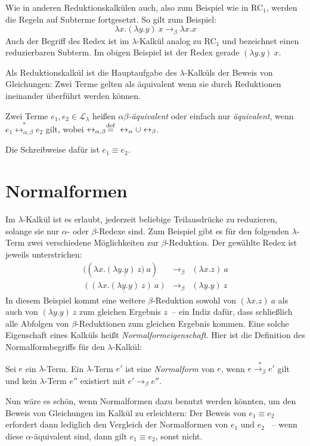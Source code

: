 Wie in anderen Reduktionskalkülen auch, also zum Beispiel wie in
RC$_1$, werden die Regeln auf Subterme fortgesetzt.  So gilt zum
Beispiel:
%
\begin{displaymath}
  \lambda x.(\lambda y.y)~x \rightarrow_{\beta} \lambda x.x
\end{displaymath}
%
Auch der Begriff des Redex ist im $\lambda$-Kalkül analog zu RC$_1$
und bezeichnet einen reduzierbaren Subterm.  Im obigen Beispiel ist
der Redex gerade $(\lambda y.y)~x$.

Als Reduktionskalkül ist die Hauptaufgabe des $\lambda$-Kalküls der
Beweis von Gleichungen: Zwei Terme gelten als äquivalent wenn
sie durch Reduktionen ineinander überführt werden können.
%
\begin{definition}
  Zwei Terme $e_1, e_2\in\mathcal{L}_{\lambda}$ heißen
  \textit{$\alpha\beta$-äquivalent} oder einfach nur
  \textit{äquivalent}, wenn
  \(e_1 \overset{\ast}{\leftrightarrow_{\alpha,\beta}} e_2\)
  gilt, wobei \(\leftrightarrow_{\alpha,\beta} \stackrel{\rm def}{=}{}
  \leftrightarrow_{\alpha} \cup \leftrightarrow_{\beta}\).

  Die Schreibweise dafür ist \(e_1\equiv e_2\).
\end{definition}

\section{Normalformen}
\label{sec:normalformen}

Im $\lambda$-Kalkül ist es erlaubt,
jederzeit beliebige Teilausdrücke zu reduzieren, solange sie nur
$\alpha$- oder $\beta$-Redexe sind.  Zum Beispiel gibt es für den
folgenden $\lambda$-Term zwei verschiedene Möglichkeiten zur
$\beta$-Reduktion.  Der gewählte Redex ist jeweils unterstrichen:
%
\begin{eqnarray*}
  ((\lambda x.\underline{(\lambda y.y)~z)}~a) &\rightarrow_{\beta}& (\lambda x.z)~a\\
  \underline{((\lambda x.(\lambda y.y)~z)~a)} &\rightarrow_{\beta}& (\lambda y.y)~z
\end{eqnarray*}
%
In diesem Beispiel kommt eine weitere
$\beta$-Reduktion sowohl von $(\lambda x.z)~a$ als auch von $(\lambda
y.y)~z$ zum gleichen Ergebnis $z$~-- ein Indiz
dafür, dass schließlich alle Abfolgen von $\beta$-Reduktionen zum
gleichen Ergebnis kommen.  Eine solche Eigenschaft eines Kalküls heißt
\textit{Normalformeigenschaft}.  Hier ist die Definition des
Normalformbegriffs für den $\lambda$-Kalkül:
%
\begin{definition}[Normalform]
  Sei $e$ ein $\lambda$-Term.  Ein $\lambda$-Term $e'$ ist eine
  \textit{Normalform} von $e$, wenn
  $e\overset{\ast}{\rightarrow_\beta}e'$ gilt und kein $\lambda$-Term
  $e''$ existiert mit
  $e'\rightarrow_\beta e''$.
\end{definition}
%
Nun wäre es schön, wenn Normalformen dazu benutzt werden könnten, um
den Beweis von Gleichungen im Kalkül zu erleichtern: Der Beweis von
$e_1 \equiv e_2$ erfordert dann lediglich den Vergleich der
Normalformen von $e_1$ und $e_2$ ~-- wenn diese
$\alpha$-äquivalent sind, dann gilt $e_1\equiv e_2$, sonst nicht.

